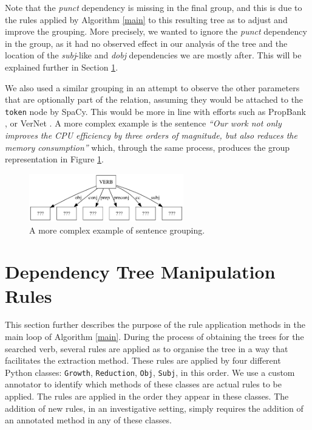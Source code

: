 \documentclass[11pt,a4paper,openright]{memoir}
\begin{document}
Note that the \emph{punct} dependency is missing in the final group, and this is due to the rules applied by Algorithm \ref{main} to this resulting tree as to adjust and improve the grouping. More precisely, we wanted to ignore the \emph{punct} dependency in the group, as it had no observed effect in our analysis of the tree and the location of the \emph{subj}-like and \emph{dobj} dependencies we are mostly after. This will be explained further in Section \ref{section:rules}. 

We also used a similar grouping in an attempt to observe the other parameters that are optionally part of the relation, assuming they would be attached to the \texttt{token} node by SpaCy. This would be more in line with efforts such as PropBank \cite{Palmer:2005:PBA:1122624.1122628}, or VerNet \cite{Schuler:2005:VBC:1104493}. A more complex example is the sentence \emph{\enquote{Our work not only improves the CPU efficiency by three orders of magnitude, but also reduces the memory consumption}} which, through the same process, produces the group representation in Figure \ref{fig:group_output_3}.

\begin{figure}[!htbp]
  \centering
    \includegraphics[width=0.6\textwidth]{./images/command-simplified-group-improves-29}
  \caption[A more complex example of sentence grouping.]{A more complex example of sentence grouping.}
  \label{fig:group_output_3}
\end{figure}



%
%
%
%

\section{Dependency Tree Manipulation Rules}
\label{section:rules}

This section further describes the purpose of the rule application methods in the main loop of Algorithm \ref{main}. During the process of obtaining the trees for the searched verb, several rules are applied as to organise the tree in a way that facilitates the extraction method. These rules are applied by four different Python classes: \texttt{Growth}, \texttt{Reduction}, \texttt{Obj}, \texttt{Subj}, in this order. We use a custom annotator to identify which methods of these classes are actual rules to be applied. The rules are applied in the order they appear in these classes. The addition of new rules, in an investigative setting, simply requires the addition of an annotated method in any of these classes.
\end{document}
